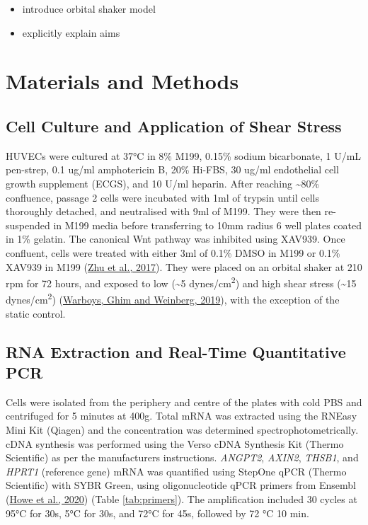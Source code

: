 \documentclass[
  11pt,
]{article}
\begin{document}
\color{red}

\begin{itemize}
\item
  introduce orbital shaker model
\item
  explicitly explain aims
\end{itemize}

\color{black}

\hypertarget{materials-and-methods}{%
\section{Materials and Methods}\label{materials-and-methods}}

\hypertarget{cell-culture-and-application-of-shear-stress}{%
\subsection{Cell Culture and Application of Shear Stress}\label{cell-culture-and-application-of-shear-stress}}

HUVECs were cultured at 37°C in 8\% M199, 0.15\% sodium bicarbonate, 1 U/mL pen-strep, 0.1 ug/ml amphotericin B, 20\% Hi-FBS, 30 ug/ml endothelial cell growth supplement (ECGS), and 10 U/ml heparin.
After reaching \textasciitilde80\% confluence, passage 2 cells were incubated with 1ml of trypsin until cells thoroughly detached, and neutralised with 9ml of M199.
They were then re-suspended in M199 media before transferring to 10mm radius 6 well plates coated in 1\% gelatin.
The canonical Wnt pathway was inhibited using XAV939.
Once confluent, cells were treated with either 3ml of 0.1\% DMSO in M199 or 0.1\% XAV939 in M199 (\protect\hyperlink{ref-Zhu2017}{Zhu et al., 2017}).
They were placed on an orbital shaker at 210 rpm for 72 hours, and exposed to low (\textasciitilde5 dynes/cm\textsuperscript{2}) and high shear stress (\textasciitilde15 dynes/cm\textsuperscript{2}) (\protect\hyperlink{ref-Warboys2019}{Warboys, Ghim and Weinberg, 2019}), with the exception of the static control.

\hypertarget{rna-extraction-and-real-time-quantitative-pcr}{%
\subsection{RNA Extraction and Real-Time Quantitative PCR}\label{rna-extraction-and-real-time-quantitative-pcr}}

Cells were isolated from the periphery and centre of the plates with cold PBS and centrifuged for 5 minutes at 400g.
Total mRNA was extracted using the RNEasy Mini Kit (Qiagen) and the concentration was determined spectrophotometrically.
cDNA synthesis was performed using the Verso cDNA Synthesis Kit (Thermo Scientific) as per the manufacturers instructions.
\emph{ANGPT2}, \emph{AXIN2}, \emph{THSB1}, and \emph{HPRT1} (reference gene) mRNA was quantified using StepOne qPCR (Thermo Scientific) with SYBR Green, using oligonucleotide qPCR primers from Ensembl (\protect\hyperlink{ref-howe2020}{Howe et al., 2020}) (Table \ref{tab:primers}).
The amplification included 30 cycles at 95°C for 30s, 5°C for 30s, and 72°C for 45s, followed by 72 °C 10 min.
\end{document}
